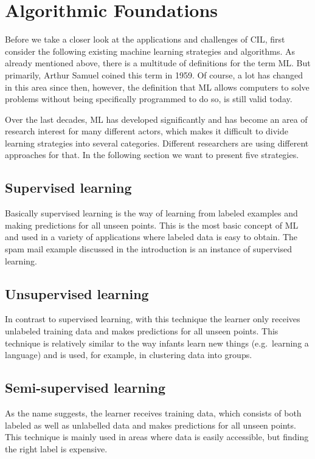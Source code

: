 \documentclass[conference,compsoc]{IEEEtran}
\begin{document}
\section{Algorithmic Foundations}
Before we take a closer look at the applications and challenges of CIL, first consider the 
following existing machine learning strategies and algorithms. As already mentioned above, 
there is a multitude of definitions for the term ML\@. But primarily, Arthur Samuel 
coined this term in 1959. Of course, a lot has changed in this area since then, 
however, the definition that ML allows computers to solve problems without being 
specifically programmed to do so, is still valid today\cite{MLStudiesUsingCheckers:samuel}.

Over the last decades, ML has developed significantly and has become an area of
research interest for many different actors, which makes it difficult to divide learning 
strategies into several categories. Different researchers are using different approaches 
for that\cite{FoundationsOfML:mohri}\cite{Structure:corne}. 
In the following section we want to present five strategies\cite{FoundationsOfML:mohri}.

\subsection{Supervised learning}
Basically supervised learning is the way of learning from labeled examples and making predictions 
for all unseen points. This is the most basic concept of ML and used in a variety of applications 
where labeled data is easy to obtain. The spam mail example discussed in the introduction is an 
instance of supervised learning.

\subsection{Unsupervised learning}
In contrast to supervised learning, with this technique the learner only receives 
unlabeled training data and makes predictions for all unseen points. This technique is 
relatively similar to the way infants learn new things (e.g.\ learning a language) and 
is used, for example, in clustering data into groups\cite{BrainInf:holzinger}.

\subsection{Semi-supervised learning}
As the name suggests, the learner receives training data, which consists of both 
labeled as well as unlabelled data and makes predictions for all unseen points.
This technique is mainly used in areas where data is easily accessible, 
but finding the right label is expensive.
\end{document}
